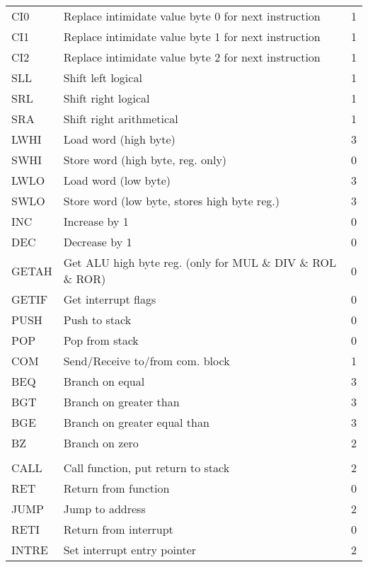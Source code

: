 \begin{longtable}[h!]{| l | p{} | c |}
CI0  & Replace intimidate value byte 0 for next instruction & 1 \\
CI1  & Replace intimidate value byte 1 for next instruction & 1 \\
CI2  & Replace intimidate value byte 2 for next instruction & 1 \\\hline

SLL  & Shift left logical & 1 \\
SRL  & Shift right logical & 1 \\
SRA  & Shift right arithmetical & 1 \\\hline

LWHI & Load word (high byte) & 3 \\
SWHI & Store word (high byte, reg. only) & 0 \\
LWLO & Load word (low byte) & 3 \\
SWLO & Store word (low byte, stores high byte reg.) & 3 \\\hline

INC  & Increase by 1 & 0 \\
DEC  & Decrease by 1 & 0 \\
GETAH& Get ALU high byte reg. (only for MUL \& DIV \& ROL \& ROR) & 0 \\
GETIF& Get interrupt flags & 0 \\\hline

PUSH & Push to stack & 0 \\
POP  & Pop from stack & 0 \\
COM  & Send/Receive to/from com. block & 1 \\\hline

BEQ  & Branch on equal & 3 \\
BGT  & Branch on greater than & 3 \\
BGE  & Branch on greater equal than & 3 \\
BZ   & Branch on zero & 2 \\

\arrayrulecolor{black}\hline
\multicolumn{3}{|c|}{
	\cellcolor[rgb]{0.7,0.7,1}\textit{0 register instructions}
} \\
\hline\arrayrulecolor[rgb]{0.82,0.82,0.82} 

CALL & Call function, put return to stack & 2 \\
RET  & Return from function & 0 \\
JUMP & Jump to address & 2 \\
RETI & Return from interrupt & 0 \\
INTRE& Set interrupt entry pointer & 2 \\\hline


\end{longtable}	

